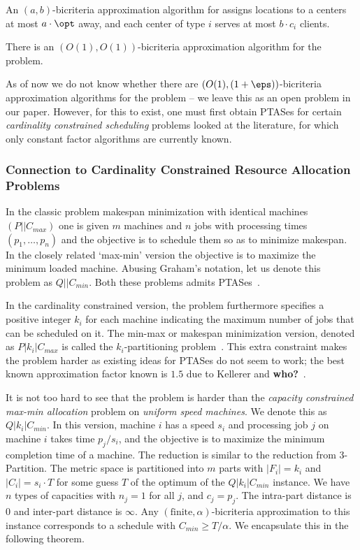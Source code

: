  \begin{definition}
 	An $(a,b)$-bicriteria approximation algorithm for \mckc assigns locations to a centers at most $a\cdot\opt$ away, and each center of type $i$ serves at most $b\cdot c_i$ clients. %
 \end{definition}

\begin{theorem}
There is an $(O(1),O(1))$-bicriteria approximation algorithm for the \mckc problem.
\end{theorem}

As of now we do not know whether there are $(O(1),(1+\eps))$-bicriteria approximation algorithms for the \mckc problem -- we leave this as an open problem in our paper.
However, for this to exist, one must first obtain PTASes for certain {\em cardinality constrained scheduling} problems looked at the literature, for which only constant factor algorithms are currently known.

\subsubsection*{Connection to Cardinality Constrained Resource Allocation Problems}
In the classic problem makespan minimization with identical machines $(P||C_{max})$ one is given $m$ machines and $n$ jobs with processing times $(p_1,\ldots,p_n)$	and the objective is to schedule them so as to minimize makespan.
In the closely related `max-min' version the objective is to maximize the minimum loaded machine. Abusing Graham's notation, let us denote this problem as $Q||C_{min}$.
Both these problems admits PTASes~\cite{bibid}. 

In the cardinality constrained version, the problem furthermore specifies a positive integer $k_i$ for each machine indicating the maximum number of jobs that can be scheduled on it. The min-max or makespan minimization version, denoted as $P|k_i|C_{max}$ is called the $k_i$-partitioning problem~\cite{bibid}.  This extra constraint makes the problem harder as existing ideas for PTASes do not seem to work; the best known approximation factor known is $1.5$ due to Kellerer and {\bf who?}~\cite{bibid}. 

It is not too hard to see that the \mckc problem is harder than the {\em capacity constrained max-min allocation} problem on {\em uniform speed machines}. We denote this as $Q|k_i|C_{min}$.
In this version,  machine $i$ has a speed $s_i$ and processing job $j$ on machine $i$ takes time $p_j/s_i$, and the objective is to maximize the minimum completion time of a machine. The reduction is similar to the reduction from $3$-Partition. The metric space is partitioned into $m$ parts with $|F_i| = k_i$ and $|C_i| = s_i\cdot T$ for some guess $T$ of the optimum of the $Q|k_i|C_{min}$ instance. We have $n$ types of capacities with $n_j = 1$ for all $j$, and $c_j = p_j$.
The intra-part distance is $0$ and inter-part distance is $\infty$. Any $(\textrm{finite},\alpha)$-bicriteria approximation to this \mckc instance corresponds to a schedule with $C_{min} \geq T/\alpha$.
We encapsulate this in the following theorem.

